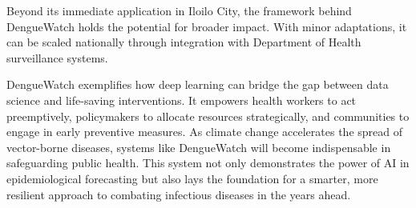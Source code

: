 Beyond its immediate application in Iloilo City, the framework behind DengueWatch holds the potential for broader impact. With minor adaptations, it can be scaled nationally through integration with Department of Health surveillance systems.

DengueWatch exemplifies how deep learning can bridge the gap between data science and life-saving interventions. It empowers health workers to act preemptively, policymakers to allocate resources strategically, and communities to engage in early preventive measures. As climate change accelerates the spread of vector-borne diseases, systems like DengueWatch will become indispensable in safeguarding public health. This system not only demonstrates the power of AI in epidemiological forecasting but also lays the foundation for a smarter, more resilient approach to combating infectious diseases in the years ahead.
